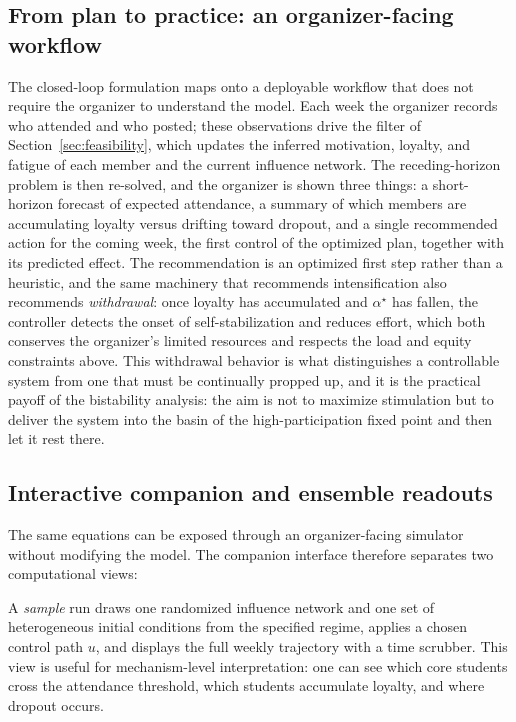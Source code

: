 \documentclass[11pt]{article}
\begin{document}
\subsection{From plan to practice: an organizer-facing workflow}\label{sec:workflow}
The closed-loop formulation maps onto a deployable workflow that does not require the organizer to understand the model. Each week the organizer records who attended and who posted; these observations drive the filter of Section~\ref{sec:feasibility}, which updates the inferred motivation, loyalty, and fatigue of each member and the current influence network. The receding-horizon problem is then re-solved, and the organizer is shown three things: a short-horizon forecast of expected attendance, a summary of which members are accumulating loyalty versus drifting toward dropout, and a single recommended action for the coming week, the first control of the optimized plan, together with its predicted effect. The recommendation is an optimized first step rather than a heuristic, and the same machinery that recommends intensification also recommends \emph{withdrawal}: once loyalty has accumulated and $\alpha^\star$ has fallen, the controller detects the onset of self-stabilization and reduces effort, which both conserves the organizer's limited resources and respects the load and equity constraints above. This withdrawal behavior is what distinguishes a controllable system from one that must be continually propped up, and it is the practical payoff of the bistability analysis: the aim is not to maximize stimulation but to deliver the system into the basin of the high-participation fixed point and then let it rest there.



\subsection{Interactive companion and ensemble readouts}\label{sec:companion}
The same equations can be exposed through an organizer-facing simulator without modifying the model. The companion interface therefore separates two computational views:

A \emph{sample} run draws one randomized influence network and one set of heterogeneous initial conditions from the specified regime, applies a chosen control path $u$, and displays the full weekly trajectory with a time scrubber. This view is useful for mechanism-level interpretation: one can see which core students cross the attendance threshold, which students accumulate loyalty, and where dropout occurs.
\end{document}
